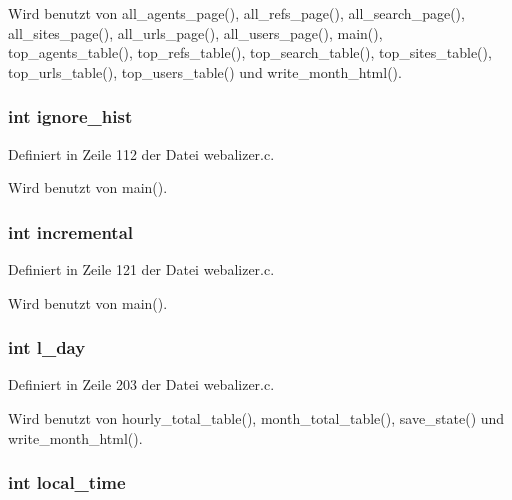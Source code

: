 Wird benutzt von all\_\-agents\_\-page(), all\_\-refs\_\-page(), all\_\-search\_\-page(), all\_\-sites\_\-page(), all\_\-urls\_\-page(), all\_\-users\_\-page(), main(), top\_\-agents\_\-table(), top\_\-refs\_\-table(), top\_\-search\_\-table(), top\_\-sites\_\-table(), top\_\-urls\_\-table(), top\_\-users\_\-table() und write\_\-month\_\-html().
\subsubsection{\setlength{\rightskip}{0pt plus 5cm}int {\bf ignore\_\-hist}}\label{webalizer_8h_9c25fea667217c12ecade9cfac496daa}




Definiert in Zeile 112 der Datei webalizer.c.

Wird benutzt von main().
\subsubsection{\setlength{\rightskip}{0pt plus 5cm}int {\bf incremental}}\label{webalizer_8h_534a10f9409e025831882efe4a58f959}




Definiert in Zeile 121 der Datei webalizer.c.

Wird benutzt von main().
\subsubsection{\setlength{\rightskip}{0pt plus 5cm}int {\bf l\_\-day}}\label{webalizer_8h_3322d751ac470f626bc34fb8b34c1759}




Definiert in Zeile 203 der Datei webalizer.c.

Wird benutzt von hourly\_\-total\_\-table(), month\_\-total\_\-table(), save\_\-state() und write\_\-month\_\-html().
\subsubsection{\setlength{\rightskip}{0pt plus 5cm}int {\bf local\_\-time}}\label{webalizer_8h_34c0559db82e0af71c64d53206f763c8}




